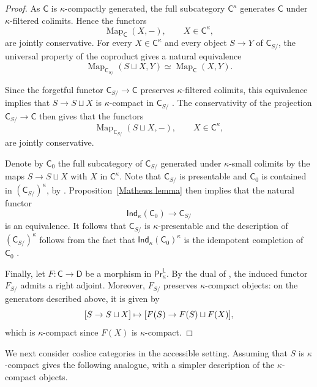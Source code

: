 \begin{proof}
As $\mathsf{C}$ is $\kappa$-compactly generated, the full subcategory $\mathsf{C}^\kappa$ generates $\mathsf{C}$ under $\kappa$-filtered colimits. Hence the functors
\[\operatorname{Map}_{\mathsf{C}}(X,-),\qquad X\in\mathsf{C}^\kappa,\]
are jointly conservative. For every $X\in\mathsf{C}^\kappa$ and every object $S\to Y$ of $\mathsf{C}_{S/}$, the universal property of the coproduct gives a natural equivalence
\[\operatorname{Map}_{\mathsf{C}_{S/}}(S\sqcup X,Y)\simeq\operatorname{Map}_{\mathsf{C}}(X,Y).\]

Since the forgetful functor $\mathsf{C}_{S/}\to\mathsf{C}$ preserves $\kappa$-filtered colimits, this equivalence implies that $S\to S\sqcup X$ is $\kappa$-compact in $\mathsf{C}_{S/}$ \cite[Tags~\href{https://kerodon.net/tag/0236}{0236}, \href{https://kerodon.net/tag/02KT}{02KT}, and \href{https://kerodon.net/tag/02PH}{02PH}]{kerodon}. The conservativity of the projection $\mathsf{C}_{S/}\to\mathsf{C}$ then gives that the functors
\[\operatorname{Map}_{\mathsf{C}_{S/}}(S\sqcup X,-),
\qquad X\in\mathsf{C}^\kappa,\]
are jointly conservative.

Denote by $\mathsf{C}_0$ the full subcategory of $\mathsf{C}_{S/}$ generated under $\kappa$-small colimits by the maps $S\to S\sqcup X$ with $X$ in $\mathsf{C}^\kappa$. Note that $\mathsf{C}_{S/}$ is presentable and $\mathsf{C}_0$ is contained in $(\mathsf{C}_{S/})^\kappa$, by \cite[Tags~\href{https://kerodon.net/tag/06P6}{06P6} and \href{https://kerodon.net/tag/064X}{064X}]{kerodon}. Proposition~\ref{Mathews lemma} then implies that the natural functor
\[\mathsf{Ind}_\kappa(\mathsf{C}_0)\to \mathsf{C}_{S/}\]
is an equivalence. It follows that $\mathsf{C}_{S/}$ is $\kappa$-presentable and the description of $(\mathsf{C}_{S/})^\kappa$ follows from the fact that $\mathsf{Ind}_\kappa(\mathsf{C}_0)^\kappa$ is the idempotent completion of $\mathsf{C}_0$ \cite[Lem.~5.4.2.4]{lurie2009HTT}.

Finally, let $F\colon\mathsf{C}\to\mathsf{D}$ be a morphism in $\mathsf{Pr}^{\mathsf{L}}_\kappa$. By the dual of \cite[Tag~\href{https://kerodon.net/tag/02KD}{02KD}]{kerodon}, the induced functor $F_{S/}$ admits a right adjoint. Moreover, $F_{S/}$ preserves $\kappa$-compact objects: on the generators described above, it is given by
\[\mleft[S\to S\sqcup X\mright]\mapsto\mleft[F(S)\to F(S)\sqcup F(X)\mright],\]
which is $\kappa$-compact since $F(X)$ is $\kappa$-compact.
\end{proof}

We next consider coslice categories in the accessible setting. Assuming that $S$ is $\kappa$-compact gives the following analogue, with a simpler description of the $\kappa$-compact objects.

